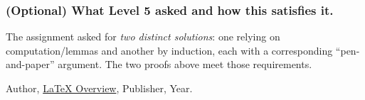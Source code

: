 \documentclass{article}
\theoremstyle{theorem}
\theoremstyle{definition}
\theoremstyle{remark}
\begin{document}
\subsubsection*{(Optional) What Level 5 asked and how this satisfies it.}
The assignment asked for \emph{two distinct solutions}: one relying on computation/lemmas and another by induction, each with a corresponding “pen-and-paper” argument. The two proofs above meet those requirements.


\begin{thebibliography}{99}
 Author, \href{https://en.wikipedia.org/wiki/LaTeX}{LaTeX Overview}, Publisher, Year.
\end{thebibliography}
\end{document}
